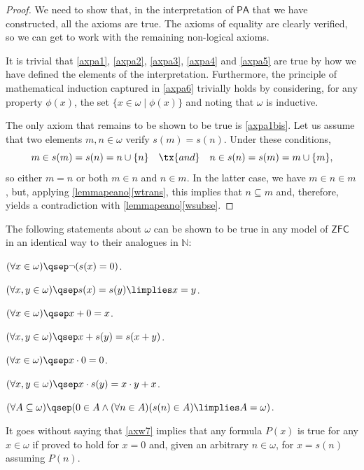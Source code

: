 \begin{proof}
We need to show that, in the interpretation of $\mathsf{PA}$ that we have constructed, all the axioms are true.
The axioms of equality are clearly verified, so we can get to work with the remaining non-logical axioms.

It is trivial that \ref{axpa1}, \ref{axpa2}, \ref{axpa3}, \ref{axpa4} and \ref{axpa5} are true by how we have defined the elements of the interpretation. Furthermore, the principle of mathematical induction captured in \ref{axpa6} trivially holds by considering, for any property $\phi(x)$, the set $\{x\in \omega\mid \phi(x)\}$ and noting that $\omega$ is inductive.

The only axiom that remains to be shown to be true is \ref{axpa1bis}.
Let us assume that two elements $m,n\in \omega$ verify $s(m) = s(n)$.
Under these conditions,
\[ m\in s(m) = s(n) = n \cup \{n\} \quad \tx{and} \quad n\in s(n) = s(m) = m \cup \{m\},\]
so either $m = n$ or both $m\in n$ and $n\in m$. In the latter case, we have $m\in n \in m$, but, applying \ref{lemmapeano}\ref{wtrans}, this implies that $n\subseteq m$ and, therefore, yields a contradiction with \ref{lemmapeano}\ref{wsubse}.
\end{proof}

\begin{para}
The following statements about $\omega$ can be shown to be true in any model of $\mathsf{ZFC}$ in an identical way to their analogues in $\mathbb{N}$:
\begin{axioms}[$\omega$]
\item \label{axw1} $(\forall x\in \omega)\qsep\lnot(s(x) = 0)$.
\item \label{axw2} $(\forall x,y\in \omega)\qsep s(x) = s(y) \limplies x = y$.
\item \label{axw3} $(\forall x\in \omega)\qsep x + 0 = x$.
\item \label{axw4} $(\forall x,y\in \omega)\qsep x + s(y) = s(x+y)$.
\item \label{axw5} $(\forall x\in \omega)\qsep x \cdot 0 = 0$.
\item \label{axw6} $(\forall x,y\in \omega)\qsep x \cdot s(y) = x\cdot y + x$.
\item \label{axw7} $(\forall A \subseteq \omega)\qsep (0 \in A \land  (\forall n\in A) (s(n) \in A) \limplies A = \omega)$. 
\end{axioms}
It goes without saying that \ref{axw7} implies that any formula $P(x)$
is true for any $x\in \omega$ if proved to hold for $x = 0$ and, given an arbitrary $n\in \omega$, for $x = s(n)$ assuming $P(n)$.
\end{para}

